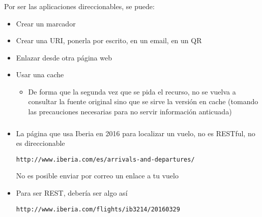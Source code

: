 \documentclass[ucs]{beamer}
\begin{document}
\begin{frame}[fragile]
\frametitle{}
Por ser las aplicaciones direccionables, se puede:

\begin{itemize}
\item
Crear un marcador
\item
Crear una URI, ponerla por escrito, en un email, en un QR
\item
Enlazar desde otra página web
\item

Usar una cache

\begin{itemize}
\item
De forma que la segunda vez que se pida el recurso,
no se vuelva a consultar la fuente original sino que se sirve la versión
en cache (tomando las precauciones necesarias para no servir información
anticuada)
\end{itemize}

\end{itemize}

\end{frame}

\begin{frame}[fragile]
\frametitle{}

\begin{itemize}
\item
La página que usa Iberia en 2016 para localizar un vuelo, no es RESTful, no es direccionable
  \begin{footnotesize}
  \begin{verbatim}
http://www.iberia.com/es/arrivals-and-departures/
  \end{verbatim}
  \end{footnotesize}
No es posible enviar por correo un enlace a tu vuelo

\item
Para ser REST, debería ser algo así
  \begin{footnotesize}
  \begin{verbatim}
http://www.iberia.com/flights/ib3214/20160329
  \end{verbatim}
  \end{footnotesize}

\end{itemize}

\end{frame}
\end{document}
